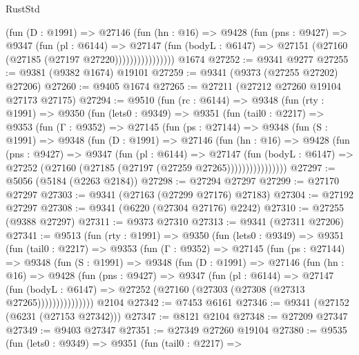 \begin{lexlean}{RustStd}
\begin{coremodule}
                    (fun (D : @1991) =>
                    @27146
                      (fun (hn : @16) =>
                      @9428
                        (fun (pns : @9427) =>
                        @9347
                          (fun (pl : @6144) =>
                          @27147
                            (fun (bodyL : @6147) =>
                            @27151 (@27160 (@27185 (@27197 @27220))))))))))))))))
    @1674
@27252 := @9341 @9277
@27255 := @9381 (@9382 @1674) @19101
@27259 := @9341 (@9373 (@27255 @27202) @27206)
@27260 := @9405 @1674
@27265 := @27211 (@27212 @27260 @19104 @27173 @27175)
@27294 := @9510
    (fun (rc : @6144) =>
    @9348
      (fun (rty : @1991) =>
      @9350
        (fun (lets0 : @9349) =>
        @9351
          (fun (tail0 : @2217) =>
          @9353
            (fun (Γ : @9352) =>
            @27145
              (fun (ps : @27144) =>
              @9348
                (fun (S : @1991) =>
                @9348
                  (fun (D : @1991) =>
                  @27146
                    (fun (hn : @16) =>
                    @9428
                      (fun (pns : @9427) =>
                      @9347
                        (fun (pl : @6144) =>
                        @27147
                          (fun (bodyL : @6147) =>
                          @27252 (@27160 (@27185 (@27197 (@27259 @27265))))))))))))))))
@27297 := @5056 (@5184 (@2263 @2184))
@27298 := @27294 @27297
@27299 := @27170 @27297
@27303 := @9341 (@27163 (@27299 @27176) @27183)
@27304 := @27192 @27297
@27308 := @9341 (@6220 (@27304 @27176) @2242)
@27310 := @27255 (@9388 @27297)
@27311 := @9373 @27310
@27313 := @9341 (@27311 @27206)
@27341 := @9513
    (fun (rty : @1991) =>
    @9350
      (fun (lets0 : @9349) =>
      @9351
        (fun (tail0 : @2217) =>
        @9353
          (fun (Γ : @9352) =>
          @27145
            (fun (ps : @27144) =>
            @9348
              (fun (S : @1991) =>
              @9348
                (fun (D : @1991) =>
                @27146
                  (fun (hn : @16) =>
                  @9428
                    (fun (pns : @9427) =>
                    @9347
                      (fun (pl : @6144) =>
                      @27147
                        (fun (bodyL : @6147) =>
                        @27252 (@27160 (@27303 (@27308 (@27313 @27265)))))))))))))))
    @2104
@27342 := @7453 @6161
@27346 := @9341 (@27152 (@6231 (@27153 @27342)))
@27347 := @8121 @2104
@27348 := @27209 @27347
@27349 := @9403 @27347
@27351 := @27349 @27260 @19104
@27380 := @9535
    (fun (lets0 : @9349) =>
    @9351
      (fun (tail0 : @2217) =>

\end{coremodule}
\end{lexlean}
